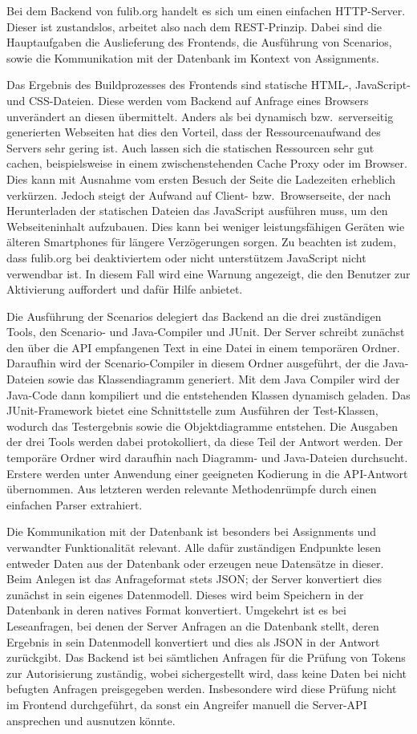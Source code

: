 Bei dem Backend von fulib.org handelt es sich um einen einfachen HTTP-Server.
Dieser ist zustandslos, arbeitet also nach dem REST-Prinzip.
Dabei sind die Hauptaufgaben die Auslieferung des Frontends,
die Ausführung von Scenarios,
sowie die Kommunikation mit der Datenbank im Kontext von Assignments.

Das Ergebnis des Buildprozesses des Frontends sind statische HTML-, JavaScript- und CSS-Dateien.
Diese werden vom Backend auf Anfrage eines Browsers unverändert an diesen übermittelt.
Anders als bei dynamisch bzw.\ serverseitig generierten Webseiten hat dies den Vorteil,
dass der Ressourcenaufwand des Servers sehr gering ist.
Auch lassen sich die statischen Ressourcen sehr gut cachen,
beispielsweise in einem zwischenstehenden Cache Proxy oder im Browser.
Dies kann mit Ausnahme vom ersten Besuch der Seite die Ladezeiten erheblich verkürzen.
Jedoch steigt der Aufwand auf Client- bzw.\ Browserseite,
der nach Herunterladen der statischen Dateien das JavaScript ausführen muss, um den Webseiteninhalt aufzubauen.
Dies kann bei weniger leistungsfähigen Geräten wie älteren Smartphones für längere Verzögerungen sorgen.
Zu beachten ist zudem, dass fulib.org bei deaktiviertem oder nicht unterstützem JavaScript nicht verwendbar ist.
In diesem Fall wird eine Warnung angezeigt, die den Benutzer zur Aktivierung auffordert und dafür Hilfe anbietet.

Die Ausführung der Scenarios delegiert das Backend an die drei zuständigen Tools,
den Scenario- und Java-Compiler und JUnit.
Der Server schreibt zunächst den über die API empfangenen Text in eine Datei in einem temporären Ordner.
Daraufhin wird der Scenario-Compiler in diesem Ordner ausgeführt,
der die Java-Dateien sowie das Klassendiagramm generiert.
Mit dem Java Compiler wird der Java-Code dann kompiliert und die entstehenden Klassen dynamisch geladen.
Das JUnit-Framework bietet eine Schnittstelle zum Ausführen der Test-Klassen,
wodurch das Testergebnis sowie die Objektdiagramme entstehen.
Die Ausgaben der drei Tools werden dabei protokolliert, da diese Teil der Antwort werden.
Der temporäre Ordner wird daraufhin nach Diagramm- und Java-Dateien durchsucht.
Erstere werden unter Anwendung einer geeigneten Kodierung in die API-Antwort übernommen.
Aus letzteren werden relevante Methodenrümpfe durch einen einfachen Parser extrahiert.

Die Kommunikation mit der Datenbank ist besonders bei Assignments und verwandter Funktionalität relevant.
Alle dafür zuständigen Endpunkte lesen entweder Daten aus der Datenbank oder erzeugen neue Datensätze in dieser.
Beim Anlegen ist das Anfrageformat stets JSON;
der Server konvertiert dies zunächst in sein eigenes Datenmodell.
Dieses wird beim Speichern in der Datenbank in deren natives Format konvertiert.
Umgekehrt ist es bei Leseanfragen, bei denen der Server Anfragen an die Datenbank stellt,
deren Ergebnis in sein Datenmodell konvertiert und dies als JSON in der Antwort zurückgibt.
Das Backend ist bei sämtlichen Anfragen für die Prüfung von Tokens zur Autorisierung zuständig,
wobei sichergestellt wird, dass keine Daten bei nicht befugten Anfragen preisgegeben werden.
Insbesondere wird diese Prüfung nicht im Frontend durchgeführt,
da sonst ein Angreifer manuell die Server-API ansprechen und ausnutzen könnte.

